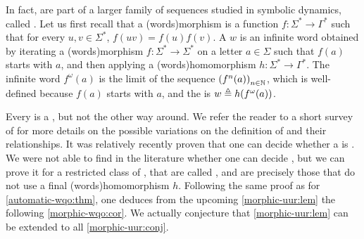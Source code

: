 \AP In fact,  are part of a larger family of sequences
studied in symbolic dynamics, called . Let us first
recall that a \intro(words){morphism} is a function $f \colon \Sigma^* \to
\Gamma^*$ such that for every $u,v \in \Sigma^*$, $f(uv) = f(u)f(v)$. A
 $w$ is an infinite word obtained by iterating a
\kl(words){morphism} $f \colon \Sigma^* \to \Sigma^*$ on a letter $a \in
\Sigma$ such that $f(a)$ starts with $a$, and then applying a
\kl(words){homomorphism} $h \colon \Sigma^* \to \Gamma^*$. The infinite word
$f^\omega(a)$ is the limit of the sequence $\seqof{f^n(a)}[n \in \Nat]$, which
is well-defined because $f(a)$ starts with $a$, and the 
is $ w \triangleq h(f^\omega(a))$. 

\AP
Every  is a , but not the other way around. We refer
the reader to a short survey of \cite{ALSZ17} for more details on the possible
variations on the definition of  and their relationships.
It was relatively recently proven that one can decide whether a  is  \cite[Theorem 1]{DURAND13}. We were not
able to find in the literature whether one can decide , but we can prove it for a restricted class of , that are called , and are precisely
those that do not use a final \kl(words){homomorphism} $h$. Following the same proof
as for \cref{automatic-wqo:thm}, one deduces from the upcoming
\cref{morphic-uur:lem} the following \cref{morphic-wqo:cor}. We actually
conjecture that \cref{morphic-uur:lem} can be extended to all  \cref{morphic-uur:conj}.

